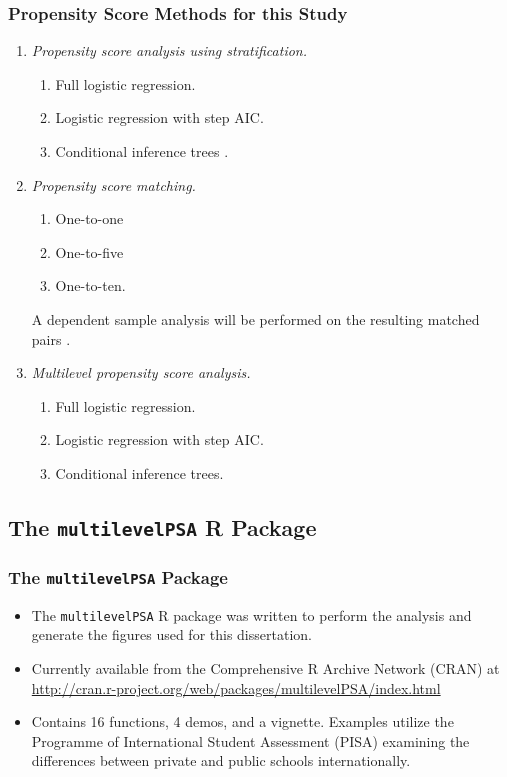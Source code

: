 \documentclass[10pt,handout,mathserif]{beamer}
\begin{document}
\begin{frame}
	\frametitle{Propensity Score Methods for this Study}
	\begin{enumerate}
	    \setlength{\itemsep}{15pt}

		\item \textit{Propensity score analysis using stratification.}
		\begin{enumerate}
			\item Full logistic regression. 
			\item Logistic regression with step AIC.
			\item Conditional inference trees \cite{HorthornHornikZeileis2006}.
		\end{enumerate}
	\pause
	\item \textit{Propensity score matching.} 
		\begin{enumerate}
			\item One-to-one
			\item One-to-five
			\item One-to-ten.
		\end{enumerate}
		A dependent sample analysis will be performed on the resulting matched pairs \cite{Austin2011}.
	\pause
	\item \textit{Multilevel propensity score analysis.}
		\begin{enumerate}
			\item Full logistic regression.
			\item Logistic regression with step AIC.
			\item Conditional inference trees.
		\end{enumerate}
	\end{enumerate}
\end{frame}

\subsection{The \texttt{multilevelPSA} R Package}

\begin{frame}
    \frametitle{The \texttt{multilevelPSA} Package}
    \begin{itemize}
        \setlength{\itemsep}{10pt}
        \item The \texttt{multilevelPSA} R package was written to perform the analysis and generate the figures used for this dissertation.
        \item Currently available from the Comprehensive R Archive Network (CRAN) at \url{http://cran.r-project.org/web/packages/multilevelPSA/index.html}
        \item Contains 16 functions, 4 demos, and a vignette. Examples utilize the Programme of International Student Assessment (PISA) examining the differences between private and public schools internationally.
    \end{itemize}
\end{frame}
\end{document}

